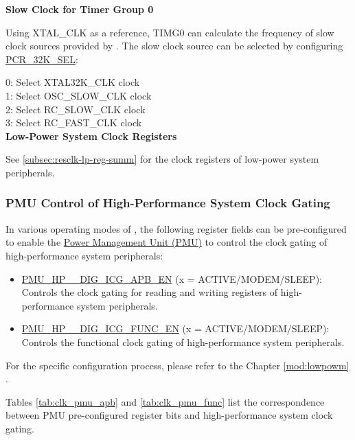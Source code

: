 \documentclass[main\_\_EN.tex]{subfiles}
\begin{document}
\textbf{Slow Clock for Timer Group 0}
\label{sec:pcr_peri_timg}

Using XTAL\_CLK as a reference, TIMG0 can calculate the frequency of slow clock sources provided by \chipname{}. The slow clock source can be selected by configuring \hyperref[fielddesc:PCR32KSEL]{PCR\_32K\_SEL}:

0: Select XTAL32K\_CLK clock\\
1: Select OSC\_SLOW\_CLK clock\\
2: Select RC\_SLOW\_CLK clock\\
3: Select RC\_FAST\_CLK clock\\


\textbf{Low-Power System Clock Registers}

See \ref{subsec:resclk-lp-reg-summ} \textit{} for the clock registers of low-power system peripherals.



\subsubsection{PMU Control of High-Performance System Clock Gating}
In various operating modes of \chipname{}, the following register fields can be pre-configured to enable the \hyperref[mod:lowpowm]{Power Management Unit (PMU)} to control the clock gating of high-performance system peripherals:

\begin{itemize}
    \item \hyperref[fielddesc:PMUHPACTIVEDIGICGAPBEN]{PMU\_HP\_\_DIG\_ICG\_APB\_EN} (x = ACTIVE/MODEM/SLEEP): Controls the clock gating for reading and writing registers of high-performance system peripherals.
    \item \hyperref[fielddesc:PMUHPACTIVEDIGICGFUNCEN]{PMU\_HP\_\_DIG\_ICG\_FUNC\_EN} (x = ACTIVE/MODEM/SLEEP): Controls the functional clock gating of high-performance system peripherals.
\end{itemize}

For the specific configuration process, please refer to the Chapter \ref{mod:lowpowm} \textit{}.

Tables \ref{tab:clk_pmu_apb} and \ref{tab:clk_pmu_func} list the correspondence between PMU pre-configured register bits and high-performance system clock gating.
\end{document}
